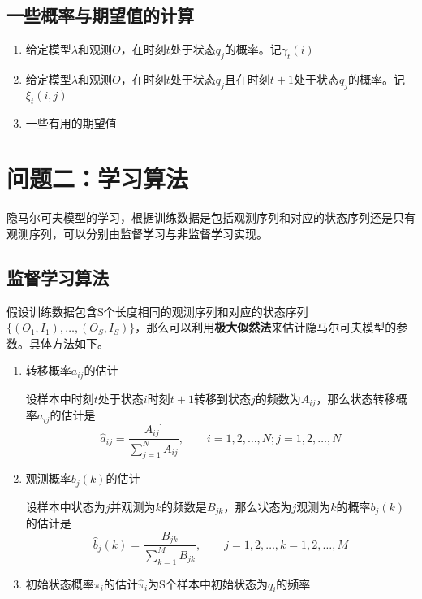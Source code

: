 \subsection*{一些概率与期望值的计算}
\begin{enumerate}
	\item 给定模型$\lambda$和观测$O$，在时刻$t$处于状态$q_j$的概率。记$\gamma_t(i)$
	\item 给定模型$\lambda$和观测$O$，在时刻$t$处于状态$q_j$且在时刻$t+1$处于状态$q_j$的概率。记$\xi_t(i,j)$
	\item 一些有用的期望值
\end{enumerate}
\section*{问题二：学习算法}
隐马尔可夫模型的学习，根据训练数据是包括观测序列和对应的状态序列还是只有观测序列，可以分别由监督学习与非监督学习实现。
\subsection*{监督学习算法}
假设训练数据包含S个长度相同的观测序列和对应的状态序列$\{(O_1,I_1),\dots,(O_S,I_S)\}$，那么可以利用\textbf{极大似然法}来估计隐马尔可夫模型的参数。具体方法如下。
\begin{enumerate}
	\item 转移概率$a_{ij}$的估计
	
	设样本中时刻$t$处于状态$i$时刻$t+1$转移到状态$j$的频数为$A_{ij}$，那么状态转移概率$a_{ij}$的估计是
	\begin{equation}
		\hat{a}_{ij}=\frac{A_{ij}]}{\sum\limits_{j=1}^{N}A_{ij}},\qquad i=1,2,\dots,N;j=1,2,\dots,N
	\end{equation}
	\item 观测概率$b_j(k)$的估计
	
	设样本中状态为$j$并观测为$k$的频数是$B_{jk}$，那么状态为$j$观测为$k$的概率$b_j(k)$的估计是
	\begin{equation}
		\hat{b}_j(k)=\frac{B_{jk}}{\sum\limits_{k=1}^{M}B_{jk}},\qquad j=1,2,\dots,k=1,2,\dots,M
	\end{equation}
	\item 初始状态概率$\pi_i$的估计$\hat{\pi}_i$为S个样本中初始状态为$q_i$的频率
\end{enumerate}
